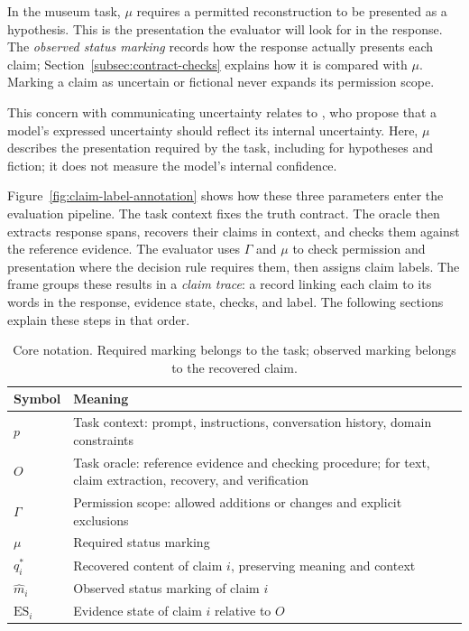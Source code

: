 \documentclass{clv2025}
\begin{document}
In the museum task, $\mu$ requires a permitted reconstruction to be
presented as a hypothesis. This is the presentation the evaluator will
look for in the response. The \emph{observed status marking} records how
the response actually presents each claim; Section~\ref{subsec:contract-checks}
explains how it is compared with $\mu$. Marking a claim as uncertain or
fictional never expands its permission scope.

This concern with communicating uncertainty relates to
\citet{yona_metacognition_2026}, who propose that a model's expressed
uncertainty should reflect its internal uncertainty. Here, $\mu$ describes
the presentation required by the task, including for hypotheses and fiction;
it does not measure the model's internal confidence.

Figure~\ref{fig:claim-label-annotation} shows how these three parameters
enter the evaluation pipeline. The task context fixes the truth contract.
The oracle then extracts response spans, recovers their claims in context,
and checks them against the reference evidence. The evaluator uses
$\Gamma$ and $\mu$ to check permission and presentation where the decision
rule requires them, then assigns claim labels. The frame groups these
results in a \emph{claim trace}: a record linking each claim to its words
in the response, evidence state, checks, and label. The following sections
explain these steps in that order.



\begin{table}[!ht]
\centering\small
\caption{Core notation. Required marking belongs to the task; observed marking belongs to the recovered claim.}
\label{tab:notation}
\begin{tabularx}{\linewidth}{@{}lY@{}}
\toprule
Symbol & Meaning\\\midrule
$p$ & Task context: prompt, instructions, conversation history, domain constraints\\
$O$ & Task oracle: reference evidence and checking procedure; for text, claim extraction, recovery, and verification\\
$\Gamma$ & Permission scope: allowed additions or changes and explicit exclusions\\
$\mu$ & Required status marking\\
$q_i^*$ & Recovered content of claim $i$, preserving meaning and context\\
$\widehat{m}_i$ & Observed status marking of claim $i$\\
$\mathrm{ES}_i$ & Evidence state of claim $i$ relative to $O$\\
\bottomrule
\end{tabularx}
\end{table}
\end{document}

